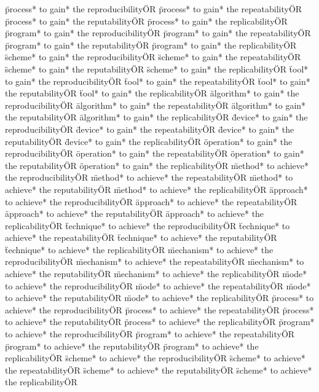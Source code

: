 \documentclass[
10pt, %
a4paper, %
oneside, %
headinclude,footinclude, %
BCOR5mm, %
]{scrartcl}
\begin{document}
\"process* to gain* the reproducibility\" OR \"process* to gain* the repeatability\" OR \"process* to gain* the reputability\" OR \"process* to gain* the replicability\" OR 
\"program* to gain* the reproducibility\" OR \"program* to gain* the repeatability\" OR \"program* to gain* the reputability\" OR \"program* to gain* the replicability\" OR 
\"scheme* to gain* the reproducibility\" OR \"scheme* to gain* the repeatability\" OR \"scheme* to gain* the reputability\" OR \"scheme* to gain* the replicability\" OR 
\"tool* to gain* the reproducibility\" OR \"tool* to gain* the repeatability\" OR \"tool* to gain* the reputability\" OR \"tool* to gain* the replicability\" OR 
\"algorithm* to gain* the reproducibility\" OR \"algorithm* to gain* the repeatability\" OR \"algorithm* to gain* the reputability\" OR \"algorithm* to gain* the replicability\" OR 
\"device* to gain* the reproducibility\" OR \"device* to gain* the repeatability\" OR \"device* to gain* the reputability\" OR \"device* to gain* the replicability\" OR 
\"operation* to gain* the reproducibility\" OR \"operation* to gain* the repeatability\" OR \"operation* to gain* the reputability\" OR \"operation* to gain* the replicability\" OR 
\"method* to achieve* the reproducibility\" OR \"method* to achieve* the repeatability\" OR \"method* to achieve* the reputability\" OR \"method* to achieve* the replicability\" OR 
\"approach* to achieve* the reproducibility\" OR \"approach* to achieve* the repeatability\" OR \"approach* to achieve* the reputability\" OR \"approach* to achieve* the replicability\" OR 
\"technique* to achieve* the reproducibility\" OR \"technique* to achieve* the repeatability\" OR \"technique* to achieve* the reputability\" OR \"technique* to achieve* the replicability\" OR 
\"mechanism* to achieve* the reproducibility\" OR \"mechanism* to achieve* the repeatability\" OR \"mechanism* to achieve* the reputability\" OR \"mechanism* to achieve* the replicability\" OR 
\"mode* to achieve* the reproducibility\" OR \"mode* to achieve* the repeatability\" OR \"mode* to achieve* the reputability\" OR \"mode* to achieve* the replicability\" OR 
\"process* to achieve* the reproducibility\" OR \"process* to achieve* the repeatability\" OR \"process* to achieve* the reputability\" OR \"process* to achieve* the replicability\" OR 
\"program* to achieve* the reproducibility\" OR \"program* to achieve* the repeatability\" OR \"program* to achieve* the reputability\" OR \"program* to achieve* the replicability\" OR 
\"scheme* to achieve* the reproducibility\" OR \"scheme* to achieve* the repeatability\" OR \"scheme* to achieve* the reputability\" OR \"scheme* to achieve* the replicability\" OR 
\end{document}
